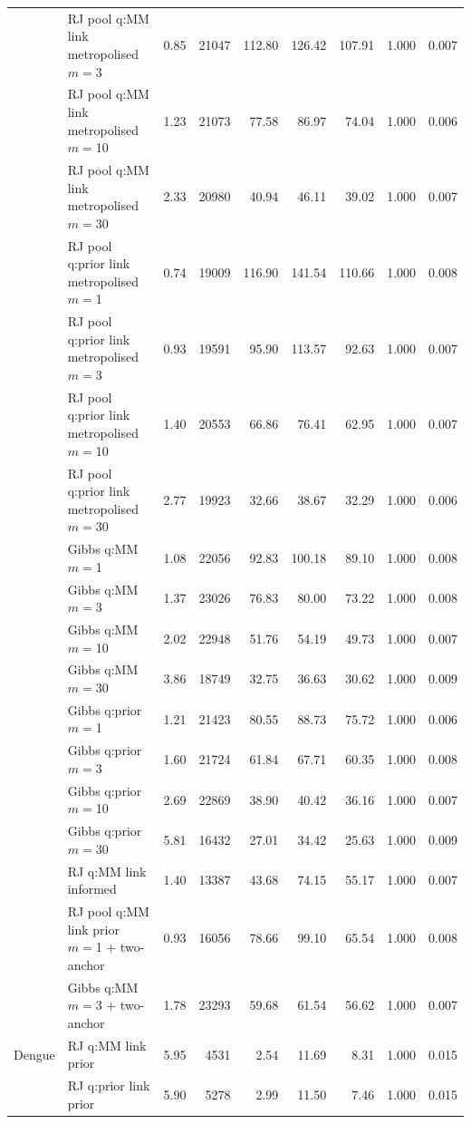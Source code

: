 \begin{tabular}{ll rrrrrrr}
 & RJ pool q:MM link metropolised $m=$3 & 0.85 & 21047 & 112.80 & 126.42 & 107.91 & 1.000 & 0.007 \\
 & RJ pool q:MM link metropolised $m=$10 & 1.23 & 21073 & 77.58 & 86.97 & 74.04 & 1.000 & 0.006 \\
 & RJ pool q:MM link metropolised $m=$30 & 2.33 & 20980 & 40.94 & 46.11 & 39.02 & 1.000 & 0.007 \\
 & RJ pool q:prior link metropolised $m=$1 & 0.74 & 19009 & 116.90 & 141.54 & 110.66 & 1.000 & 0.008 \\
 & RJ pool q:prior link metropolised $m=$3 & 0.93 & 19591 & 95.90 & 113.57 & 92.63 & 1.000 & 0.007 \\
 & RJ pool q:prior link metropolised $m=$10 & 1.40 & 20553 & 66.86 & 76.41 & 62.95 & 1.000 & 0.007 \\
 & RJ pool q:prior link metropolised $m=$30 & 2.77 & 19923 & 32.66 & 38.67 & 32.29 & 1.000 & 0.006 \\
 & Gibbs q:MM $m=$1 & 1.08 & 22056 & 92.83 & 100.18 & 89.10 & 1.000 & 0.008 \\
 & Gibbs q:MM $m=$3 & 1.37 & 23026 & 76.83 & 80.00 & 73.22 & 1.000 & 0.008 \\
 & Gibbs q:MM $m=$10 & 2.02 & 22948 & 51.76 & 54.19 & 49.73 & 1.000 & 0.007 \\
 & Gibbs q:MM $m=$30 & 3.86 & 18749 & 32.75 & 36.63 & 30.62 & 1.000 & 0.009 \\
 & Gibbs q:prior $m=$1 & 1.21 & 21423 & 80.55 & 88.73 & 75.72 & 1.000 & 0.006 \\
 & Gibbs q:prior $m=$3 & 1.60 & 21724 & 61.84 & 67.71 & 60.35 & 1.000 & 0.008 \\
 & Gibbs q:prior $m=$10 & 2.69 & 22869 & 38.90 & 40.42 & 36.16 & 1.000 & 0.007 \\
 & Gibbs q:prior $m=$30 & 5.81 & 16432 & 27.01 & 34.42 & 25.63 & 1.000 & 0.009 \\
 & RJ q:MM link informed & 1.40 & 13387 & 43.68 & 74.15 & 55.17 & 1.000 & 0.007 \\
 & RJ pool q:MM link prior $m=$1 + two-anchor & 0.93 & 16056 & 78.66 & 99.10 & 65.54 & 1.000 & 0.008 \\
 & Gibbs q:MM $m=$3 + two-anchor & 1.78 & 23293 & 59.68 & 61.54 & 56.62 & 1.000 & 0.007 \\
\addlinespace
Dengue & RJ q:MM link prior & 5.95 & 4531 & 2.54 & 11.69 & 8.31 & 1.000 & 0.015 \\
 & RJ q:prior link prior & 5.90 & 5278 & 2.99 & 11.50 & 7.46 & 1.000 & 0.015 \\

\end{tabular}
